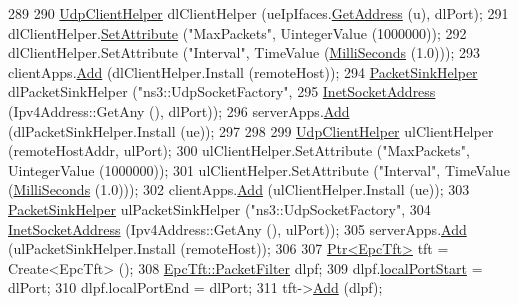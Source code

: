 \begin{DoxyCode}
289 
290           \hyperlink{classns3_1_1UdpClientHelper}{UdpClientHelper} dlClientHelper (ueIpIfaces.\hyperlink{classns3_1_1Ipv4InterfaceContainer_ae63208dcd222be986822937ee4aa828c}{GetAddress} (u), dlPort);
291           dlClientHelper.\hyperlink{classns3_1_1UdpClientHelper_a8bbae16a28f85ab3f3b5aa4642edfeae}{SetAttribute} (\textcolor{stringliteral}{"MaxPackets"}, UintegerValue (1000000));
292           dlClientHelper.SetAttribute (\textcolor{stringliteral}{"Interval"}, TimeValue (\hyperlink{group__timecivil_gaf26127cf4571146b83a92ee18679c7a9}{MilliSeconds} (1.0)));
293           clientApps.\hyperlink{classns3_1_1ApplicationContainer_ad09ab1a1ad5849d518d5f4c262e38152}{Add} (dlClientHelper.Install (remoteHost));
294           \hyperlink{classns3_1_1PacketSinkHelper}{PacketSinkHelper} dlPacketSinkHelper (\textcolor{stringliteral}{"ns3::UdpSocketFactory"},
295                                                \hyperlink{classns3_1_1InetSocketAddress}{InetSocketAddress} (Ipv4Address::GetAny (), 
      dlPort));
296           serverApps.\hyperlink{classns3_1_1ApplicationContainer_ad09ab1a1ad5849d518d5f4c262e38152}{Add} (dlPacketSinkHelper.Install (ue));
297 
298 
299           \hyperlink{classns3_1_1UdpClientHelper}{UdpClientHelper} ulClientHelper (remoteHostAddr, ulPort);
300           ulClientHelper.SetAttribute (\textcolor{stringliteral}{"MaxPackets"}, UintegerValue (1000000));
301           ulClientHelper.SetAttribute (\textcolor{stringliteral}{"Interval"}, TimeValue (\hyperlink{group__timecivil_gaf26127cf4571146b83a92ee18679c7a9}{MilliSeconds} (1.0)));
302           clientApps.\hyperlink{classns3_1_1ApplicationContainer_ad09ab1a1ad5849d518d5f4c262e38152}{Add} (ulClientHelper.Install (ue));
303           \hyperlink{classns3_1_1PacketSinkHelper}{PacketSinkHelper} ulPacketSinkHelper (\textcolor{stringliteral}{"ns3::UdpSocketFactory"},
304                                                \hyperlink{classns3_1_1InetSocketAddress}{InetSocketAddress} (Ipv4Address::GetAny (), 
      ulPort));
305           serverApps.\hyperlink{classns3_1_1ApplicationContainer_ad09ab1a1ad5849d518d5f4c262e38152}{Add} (ulPacketSinkHelper.Install (remoteHost));
306 
307           \hyperlink{classns3_1_1Ptr}{Ptr<EpcTft>} tft = Create<EpcTft> ();
308           \hyperlink{structns3_1_1EpcTft_1_1PacketFilter}{EpcTft::PacketFilter} dlpf;
309           dlpf.\hyperlink{structns3_1_1EpcTft_1_1PacketFilter_afd505cda437b1687abc4432a8bcefbaf}{localPortStart} = dlPort;
310           dlpf.localPortEnd = dlPort;
311           tft->\hyperlink{classns3_1_1EpcTft_a1228456a8abbe48cbc89bbe2d2e9af48}{Add} (dlpf);

\end{DoxyCode}
